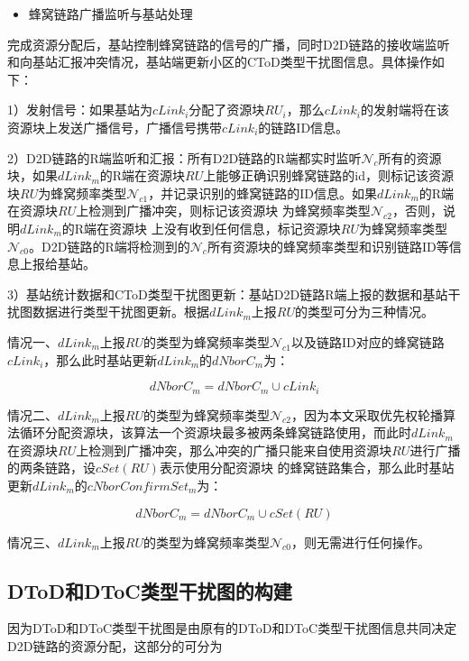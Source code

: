 \documentclass[figurelist,tablelist,algorithmlist,nomlist,masters]{seuthesix}
\begin{document}
	\begin{itemize}
		\item 蜂窝链路广播监听与基站处理
	\end{itemize}
	
	完成资源分配后，基站控制蜂窝链路的信号的广播，同时D2D链路的接收端监听和向基站汇报冲突情况，基站端更新小区的CToD类型干扰图信息。具体操作如下：
	
	1）发射信号：如果基站为$cLink_i$分配了资源块$RU_i$，那么$cLink_i$的发射端将在该资源块上发送广播信号，广播信号携带$cLink_i$的链路ID信息。
	
	2）D2D链路的R端监听和汇报：所有D2D链路的R端都实时监听$\mathcal{N}_c$所有的资源块，如果$dLink_m$的R端在资源块$RU$上能够正确识别蜂窝链路的id，则标记该资源块$RU$为蜂窝频率类型$\mathcal{N}_{c1}$，并记录识别的蜂窝链路的ID信息。如果$dLink_m$的R端在资源块$RU$上检测到广播冲突，则标记该资源块 为蜂窝频率类型$\mathcal{N}_{c2}$，否则，说明$dLink_m$的R端在资源块 上没有收到任何信息，标记资源块$RU$为蜂窝频率类型$\mathcal{N}_{c0}$。D2D链路的R端将检测到的$\mathcal{N}_c$所有资源块的蜂窝频率类型和识别链路ID等信息上报给基站。
	
	3）基站统计数据和CToD类型干扰图更新：基站D2D链路R端上报的数据和基站干扰图数据进行类型干扰图更新。根据$dLink_m$上报$RU$的类型可分为三种情况。
	
	情况一、$dLink_m$上报$RU$的类型为蜂窝频率类型$\mathcal{N}_{c1}$以及链路ID对应的蜂窝链路$cLink_i$，那么此时基站更新$dLink_m$的$dNborC_m$为：
	
	\begin{equation}\label{eq2.1}
	dNborC_m = dNborC_m \cup cLink_i
	\end{equation}
	
	情况二、$dLink_m$上报$RU$的类型为蜂窝频率类型$\mathcal{N}_{c2}$，因为本文采取优先权轮播算法循环分配资源块，该算法一个资源块最多被两条蜂窝链路使用，而此时$dLink_m$在资源块$RU$上检测到广播冲突，那么冲突的广播只能来自使用资源块$RU$进行广播的两条链路，设$cSet(RU)$表示使用分配资源块 的蜂窝链路集合，那么此时基站更新$dLink_m$的$cNborConfirmSe{t_m}$为：
	
	\begin{equation}\label{eq2.2}
	dNborC_m = dNborC_m \cup cSet(RU)
	\end{equation}
	
	情况三、$dLink_m$上报$RU$的类型为蜂窝频率类型$\mathcal{N}_{c0}$，则无需进行任何操作。
	
	
	\subsection{DToD和DToC类型干扰图的构建}
	因为DToD和DToC类型干扰图是由原有的DToD和DToC类型干扰图信息共同决定D2D链路的资源分配，这部分的可分为
	
\end{document}
